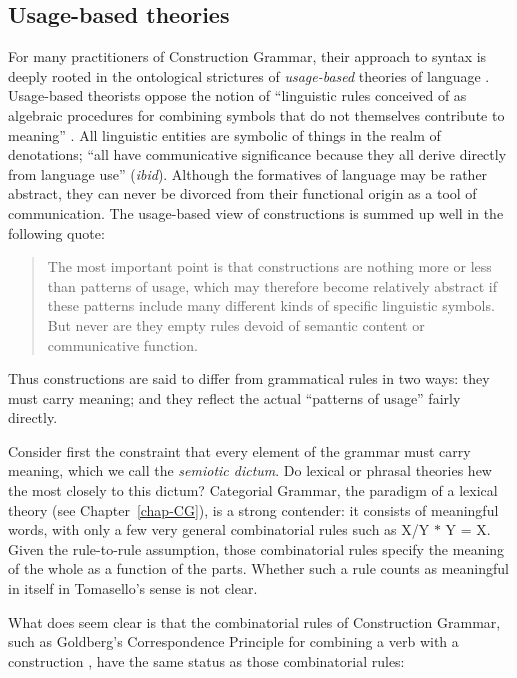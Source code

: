 \subsection{Usage-based theories}\label{usage-based-sec}

For many practitioners of Construction Grammar, their approach to syntax is deeply rooted in the
ontological strictures of \emph{usage-based} theories of language \citep{Langacker87a-u, Goldberg95a,
Croft2001a, Tomasello2003a}.  Usage-based theorists oppose the notion of ``linguistic rules conceived
of as algebraic procedures for combining symbols that do not themselves contribute to meaning''
\citep[]{Tomasello2003a}. All linguistic entities are symbolic of things in the realm of denotations;
``all have communicative significance because they all derive directly from language use'' (\emph{ibid}). Although the formatives of language may be rather abstract, they can never be divorced
from their functional origin as a tool of communication.  The usage-based view of constructions is
summed up well in the following quote:
\begin{quote}
The most important point is that constructions are nothing more or less than patterns of usage,
which may therefore become relatively abstract if these patterns include many different kinds of
specific linguistic symbols.  But never are they empty rules devoid of semantic content or
communicative function. \citep[]{Tomasello2003a}
\end{quote}

\noindent 
Thus constructions are said to differ from grammatical rules in two ways: they must carry meaning;
and they reflect the actual ``patterns of usage'' fairly directly.

Consider first the constraint that every element of the grammar must carry meaning, which we call
the \emph{semiotic dictum}.  Do lexical or phrasal theories hew the most closely to this dictum?
Categorial Grammar, the paradigm of a lexical theory (see Chapter~\ref{chap-CG}), is a strong
contender: it consists of meaningful words, with only a few very general combinatorial rules such as
X/Y $*$ Y = X.  Given the rule-to-rule assumption, those combinatorial rules specify the meaning of the
whole as a function of the parts.  Whether such a rule counts as meaningful in itself in Tomasello's
sense is not clear.

What does seem clear is that the combinatorial rules of Construction Grammar, such as Goldberg's
Correspondence Principle for combining a verb with a construction \citeyearpar[]{Goldberg95a},
have the same status as those combinatorial rules:

